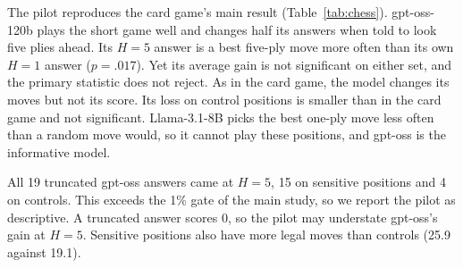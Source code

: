 \begin{table}[t]
\centering
\small
{}
\caption{Chess pilot, 120 sensitive and 120 control positions. ``Use'' is the share of sensitive positions where the $H{=}5$ answer is a best five-ply move, and the H-blind baseline is the same share for the model's own $H{=}1$ answer.}
\label{tab:chess}
\end{table}

The pilot reproduces the card game's main result (Table~\ref{tab:chess}). gpt-oss-120b plays the short game well and changes half its answers when told to look five plies ahead. Its $H{=}5$ answer is a best five-ply move more often than its own $H{=}1$ answer ($p{=}.017$). Yet its average gain is not significant on either set, and the primary statistic does not reject. As in the card game, the model changes its moves but not its score. Its loss on control positions is smaller than in the card game and not significant. Llama-3.1-8B picks the best one-ply move less often than a random move would, so it cannot play these positions, and gpt-oss is the informative model.

All 19 truncated gpt-oss answers came at $H{=}5$, 15 on sensitive positions and 4 on controls. This exceeds the 1\% gate of the main study, so we report the pilot as descriptive. A truncated answer scores 0, so the pilot may understate gpt-oss's gain at $H{=}5$. Sensitive positions also have more legal moves than controls (25.9 against 19.1).

